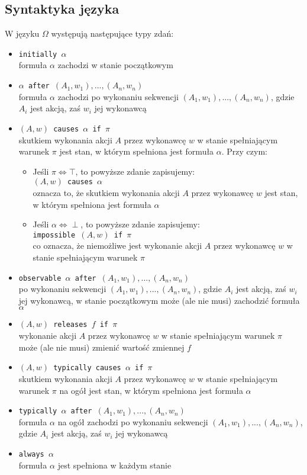 \documentclass{article}
\begin{document}
\subsection{Syntaktyka języka} 
W języku  $\Omega$ występują następujące typy zdań:
\begin{itemize}
\item {\large\texttt{initially $\alpha$}}\\
formuła $\alpha$ zachodzi w stanie początkowym
\item {\large\texttt{$\alpha$ after $(A_{1},w_{1}), ..., (A_{n},w_{n})$}}\\
formuła $\alpha$ zachodzi po wykonaniu sekwencji $(A_{1},w_{1}), ..., (A_{n},w_{n})$, gdzie $A_{i}$ jest akcją, zaś $w_{i}$ jej wykonawcą
\item {\large\texttt{$(A,w)$ causes $\alpha$ if $\pi$}}\\
skutkiem wykonania akcji $A$ przez wykonawcę $w$ w stanie spełniającym warunek $\pi$ jest stan, w którym spełniona jest formuła $\alpha$. Przy czym:
\begin{itemize}
    \item Jeśli $\pi \Leftrightarrow \top$, to powyższe zdanie zapisujemy:\\
    {\large\texttt{$(A,w)$ causes $\alpha$ }}\\
    oznacza to, że skutkiem wykonania akcji $A$ przez wykonawcę $w$ jest stan, w którym spełniona jest formuła $\alpha$
    \item Jeśli $\alpha \Leftrightarrow \perp$, to powyższe zdanie zapisujemy:\\
    {\large\texttt{impossible $(A,w)$ if $\pi$}}\\
    co oznacza, że niemożliwe jest wykonanie akcji $A$ przez wykonawcę $w$ w stanie spełniającym warunek $\pi$
\end{itemize}
\item {\large\texttt{observable $\alpha$ after $(A_{1},w_{1}), ..., (A_{n},w_{n})$}}\\
po wykonaniu sekwencji $(A_{1},w_{1}), ..., (A_{n},w_{n})$, gdzie $A_{i}$ jest akcją, zaś $w_{i}$ jej wykonawcą, w stanie początkowym może (ale nie musi) zachodzić formuła $\alpha$
\item {\large\texttt{$(A,w)$ releases $f$ if $\pi$}}\\
wykonanie akcji $A$ przez wykonawcę $w$ w stanie spełniającym warunek $\pi$ może (ale nie musi) zmienić wartość zmiennej $f$
\item {\large\texttt{$(A,w)$ typically causes $\alpha$ if $\pi$}}\\
skutkiem wykonania akcji $A$ przez wykonawcę $w$ w stanie spełniającym warunek $\pi$ na ogół jest stan, w którym spełniona jest formuła $\alpha$
\item {\large\texttt{typically $\alpha$ after $(A_{1},w_{1}), ..., (A_{n},w_{n})$}}\\
formuła $\alpha$ na ogół zachodzi po wykonaniu sekwencji $(A_{1},w_{1}), ..., (A_{n},w_{n})$, gdzie $A_{i}$ jest akcją, zaś $w_{i}$ jej wykonawcą
\item {\large\texttt{always $\alpha$}}\\
formuła $\alpha$ jest spełniona w każdym stanie
\end{itemize}
\end{document}
